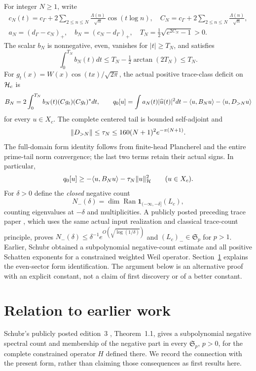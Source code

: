 \documentclass[11pt]{article}
\begin{document}
For integer $N\ge1$, write
\begin{gather*}
 c_N(t)=c_\Gamma+2\sum_{2\le n\le N}\frac{\Lambda(n)}{\sqrt n}\cos(t\log n),\quad
 C_N=c_\Gamma+2\sum_{2\le n\le N}\frac{\Lambda(n)}{\sqrt n},\\
 a_N=(d_\Gamma-c_N)_+,\quad b_N=(c_N-d_\Gamma)_+,\quad
 T_N=\tfrac12\sqrt{e^{2C_N}-1}>0.
\end{gather*}
The scalar $b_N$ is nonnegative, even, vanishes for $|t|\ge T_N$, and satisfies
\begin{equation}\label{b-integral}
 \int_0^{T_N}b_N(t)dt\le T_N-\tfrac12\arctan(2T_N)\le T_N.
\end{equation}
For $g_t(x)=W(x)\cos(tx)/\sqrt{2\pi}$, the actual positive trace-class deficit on $\mathcal H_c$ is
\begin{equation}\label{Bform}
 B_N=2\int_0^{T_N}b_N(t)(Cg_t)(Cg_t)^*dt,\qquad
 q_0[u]=\int a_N(t)|\widehat u(t)|^2dt-\langle u,B_Nu\rangle-\langle u,D_{>N}u\rangle
\end{equation}
for every $u\in X_c$. The complete centered tail is bounded self-adjoint and
\begin{equation}\label{tail}
 \lVert D_{>N}\rVert\le\tau_N\le160(N+1)^2e^{-\pi(N+1)}.
\end{equation}
The full-domain form identity follows from finite-head Plancherel and the entire prime-tail norm convergence; the last two terms retain their actual signs. In particular,
\begin{equation}\label{lower}
 q_0[u]\ge-\langle u,B_Nu\rangle-\tau_N\lVert u\rVert_{\mathcal H}^2\qquad(u\in X_c).
\end{equation}
For $\delta>0$ define the \emph{closed} negative count
\[N_-(\delta)=\dim\operatorname{Ran}\mathbf1_{(-\infty,-\delta]}(L_c),\]
counting eigenvalues at $-\delta$ and multiplicities. A publicly posted preceding trace paper \cite{previous}, which uses the same actual input realization and classical trace-count principle, proves $N_-(\delta)\le\delta^{-1}e^{O(\sqrt{\log(1/\delta)})}$ and $(L_c)_-\in\mathfrak S_p$ for $p>1$. Earlier, Schubr \cite[Theorem~1.1]{schubr} obtained a subpolynomial negative-count estimate and all positive Schatten exponents for a constrained weighted Weil operator. Section~\ref{prior} explains the even-sector form identification. The argument below is an alternative proof with an explicit constant, not a claim of first discovery or of a better constant.

\section{Relation to earlier work}\label{prior}
Schubr's publicly posted edition~3 \cite{schubr}, Theorem~1.1, gives a subpolynomial negative spectral count and membership of the negative part in every $\mathfrak S_p$, $p>0$, for the complete constrained operator $H$ defined there. We record the connection with the present form, rather than claiming those consequences as first results here.
\end{document}
